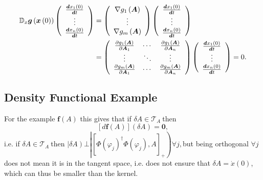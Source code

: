 \documentclass[aps,preprint]{revtex4}%
\begin{document}
\begin{align}
\mathbb{D}_{x}\boldsymbol{g}\left(  \boldsymbol{x}\left(  0\right)  \right)
\left(
\begin{array}
[c]{c}%
\frac{\boldsymbol{d}x_{1}\left(  0\right)  }{\boldsymbol{d}t}\\
\vdots\\
\frac{\boldsymbol{d}x_{n}\left(  0\right)  }{\boldsymbol{d}t}%
\end{array}
\right)   &  =\left(
\begin{array}
[c]{c}%
\nabla g_{1}\left(  \boldsymbol{A}\right) \\
\vdots\\
\nabla g_{m}\left(  \boldsymbol{A}\right)
\end{array}
\right)  \left(
\begin{array}
[c]{c}%
\frac{\boldsymbol{d}x_{1}\left(  0\right)  }{\boldsymbol{d}t}\\
\vdots\\
\frac{\boldsymbol{d}x_{n}\left(  0\right)  }{\boldsymbol{d}t}%
\end{array}
\right) \nonumber\\
&  =\left(
\begin{array}
[c]{ccc}%
\frac{\partial g_{1}\left(  \boldsymbol{A}\right)  }{\partial\boldsymbol{A}%
_{1}} & \cdots & \frac{\partial g_{1}\left(  \boldsymbol{A}\right)  }%
{\partial\boldsymbol{A}_{n}}\\
\vdots & \ddots & \vdots\\
\frac{\partial g_{m}\left(  \boldsymbol{A}\right)  }{\partial\boldsymbol{A}%
_{1}} & \cdots & \frac{\partial g_{m}\left(  \boldsymbol{A}\right)  }%
{\partial\boldsymbol{A}_{n}}%
\end{array}
\right)  \left(
\begin{array}
[c]{c}%
\frac{\boldsymbol{d}x_{1}\left(  0\right)  }{\boldsymbol{d}t}\\
\vdots\\
\frac{\boldsymbol{d}x_{n}\left(  0\right)  }{\boldsymbol{d}t}%
\end{array}
\right)  =0.
\end{align}


\subsection{Density Functional Example}

For the example $\boldsymbol{f}\left(  A\right)  $ this gives that if $\delta
A\in\mathcal{T}_{A}\mathfrak{\ }$then
\begin{equation}
\left[  d\boldsymbol{f}\left(  A\right)  \right]  \left(  \delta A\right)
=\mathbf{0}, \label{Ker}%
\end{equation}
i.e. if $\delta A\in\mathcal{T}_{A}\mathfrak{\ }$then $\left\vert \delta
A\right)  \bot\left\vert \left[  \Phi\left(  \varphi_{j}\right)  ^{\dagger
}\Phi\left(  \varphi_{j}\right)  ,A\right]  _{+}\right)  \forall j,$but being
orthogonal $\forall j$ does not mean it is in the tangent space, i.e. does not
ensure that $\delta A=\dot{x}\left(  0\right)  $, which can thus be smaller
than the kernel.
\end{document}
